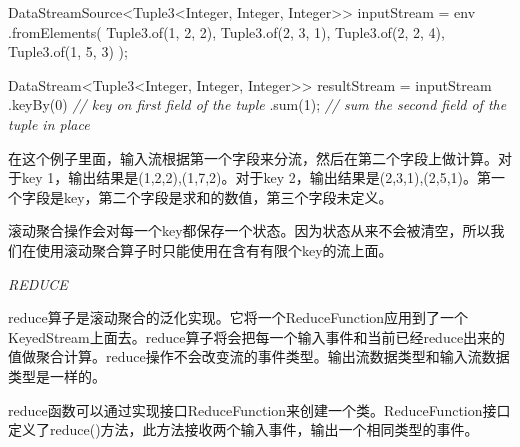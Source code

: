 \documentclass[cn,11pt,chinese]{elegantbook}
\newenvironment{Shaded}{}{}
\newcommand{\BuiltInTok}[1]{#1}
\newcommand{\CommentTok}[1]{\textcolor[rgb]{0.38,0.63,0.69}{\textit{#1}}}
\newcommand{\DecValTok}[1]{\textcolor[rgb]{0.25,0.63,0.44}{#1}}
\newcommand{\FunctionTok}[1]{\textcolor[rgb]{0.02,0.16,0.49}{#1}}
\newcommand{\NormalTok}[1]{#1}
\renewenvironment{quote}{\begin{customblockquote}\list{}{\rightmargin=0em\leftmargin=0em}%
\item\relax\color{blockquote-text}\ignorespaces}{\unskip\unskip\endlist\end{customblockquote}}
\begin{document}
\begin{Shaded}
\begin{Highlighting}[]
\NormalTok{DataStreamSource\textless{}Tuple3\textless{}}\BuiltInTok{Integer}\NormalTok{, }\BuiltInTok{Integer}\NormalTok{, }\BuiltInTok{Integer}\NormalTok{\textgreater{}\textgreater{} inputStream = env}
\NormalTok{    .}\FunctionTok{fromElements}\NormalTok{(}
\NormalTok{        Tuple3.}\FunctionTok{of}\NormalTok{(}\DecValTok{1}\NormalTok{, }\DecValTok{2}\NormalTok{, }\DecValTok{2}\NormalTok{),}
\NormalTok{        Tuple3.}\FunctionTok{of}\NormalTok{(}\DecValTok{2}\NormalTok{, }\DecValTok{3}\NormalTok{, }\DecValTok{1}\NormalTok{),}
\NormalTok{        Tuple3.}\FunctionTok{of}\NormalTok{(}\DecValTok{2}\NormalTok{, }\DecValTok{2}\NormalTok{, }\DecValTok{4}\NormalTok{),}
\NormalTok{        Tuple3.}\FunctionTok{of}\NormalTok{(}\DecValTok{1}\NormalTok{, }\DecValTok{5}\NormalTok{, }\DecValTok{3}\NormalTok{)}
\NormalTok{    );}

\NormalTok{DataStream\textless{}Tuple3\textless{}}\BuiltInTok{Integer}\NormalTok{, }\BuiltInTok{Integer}\NormalTok{, }\BuiltInTok{Integer}\NormalTok{\textgreater{}\textgreater{} resultStream = inputStream}
\NormalTok{  .}\FunctionTok{keyBy}\NormalTok{(}\DecValTok{0}\NormalTok{) }\CommentTok{// key on first field of the tuple}
\NormalTok{  .}\FunctionTok{sum}\NormalTok{(}\DecValTok{1}\NormalTok{);   }\CommentTok{// sum the second field of the tuple in place}
\end{Highlighting}
\end{Shaded}

在这个例子里面，输入流根据第一个字段来分流，然后在第二个字段上做计算。对于key
1，输出结果是(1,2,2),(1,7,2)。对于key
2，输出结果是(2,3,1),(2,5,1)。第一个字段是key，第二个字段是求和的数值，第三个字段未定义。

\begin{quote}
滚动聚合操作会对每一个key都保存一个状态。因为状态从来不会被清空，所以我们在使用滚动聚合算子时只能使用在含有有限个key的流上面。
\end{quote}

\emph{REDUCE}

reduce算子是滚动聚合的泛化实现。它将一个ReduceFunction应用到了一个KeyedStream上面去。reduce算子将会把每一个输入事件和当前已经reduce出来的值做聚合计算。reduce操作不会改变流的事件类型。输出流数据类型和输入流数据类型是一样的。

reduce函数可以通过实现接口ReduceFunction来创建一个类。ReduceFunction接口定义了reduce()方法，此方法接收两个输入事件，输出一个相同类型的事件。
\end{document}
